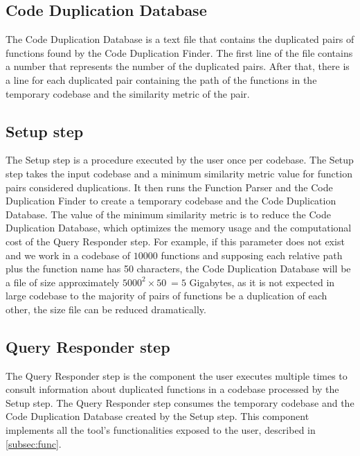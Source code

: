 \subsection{Code Duplication Database}

The Code Duplication Database is a text file that contains the duplicated pairs of 
functions found by the Code Duplication Finder. The first line of the file contains 
a number that represents the number of the duplicated pairs. After that, there is a 
line for each duplicated pair containing the path of the functions in the temporary codebase 
and the similarity metric of the pair. 

\subsection{Setup step}

\label{subsec:setup}

The Setup step is a procedure executed by the user once per codebase. The Setup step takes 
the input codebase and a minimum similarity metric value for function pairs considered 
duplications. It then runs the Function Parser and the Code Duplication Finder to create 
a temporary codebase and the Code Duplication Database. The value of the minimum similarity 
metric is to reduce the Code Duplication Database, which optimizes the memory usage and the 
computational cost of the Query Responder step. For example, if this parameter does not exist 
and we work in a codebase of $10000$ functions and supposing each relative path plus the 
function name has 50 characters, the Code Duplication Database will be a file of size 
approximately $5000^2 \times 50 ~= 5$ Gigabytes, as it is not expected in large codebase 
to the majority of pairs of functions be a duplication of each other, 
the size file can be reduced dramatically.

\subsection{Query Responder step}

The Query Responder step is the component the user executes multiple times to consult information 
about duplicated functions in a codebase processed by the Setup step. The Query Responder step 
consumes the temporary codebase and the Code Duplication Database created by the Setup step. 
This component implements all the tool’s functionalities exposed to the user, described in 
\ref{subsec:func}.

